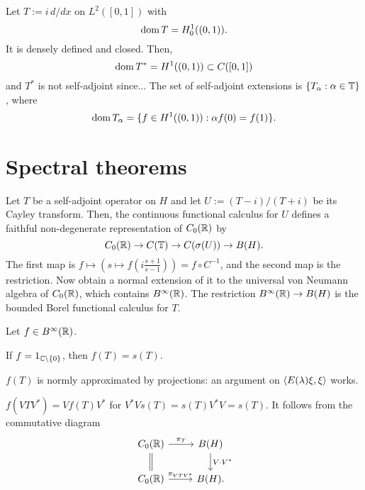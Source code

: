 \documentclass{../../large}
\begin{document}
\begin{ex*}
Let $T:=i\,d/dx$ on $L^2([0,1])$ with
\[\operatorname{dom} T=H_0^1((0,1)).\]
It is densely defined and closed.
Then,
\[\operatorname{dom} T^*=H^1((0,1))\subset C([0,1])\]
and $T^*$ is not self-adjoint since...
The set of self-adjoint extensions is $\{T_\alpha:\alpha\in\mathbb{T}\}$, where
\[\operatorname{dom} T_\alpha=\{f\in H^1((0,1)):\alpha f(0)=f(1)\}.\]
\end{ex*}



\section{Spectral theorems}
\begin{prb}
Let $T$ be a self-adjoint operator on $H$ and let $U:=(T-i)/(T+i)$ be its Cayley transform.
Then, the continuous functional calculus for $U$ defines a faithful non-degenerate representation of $C_0(\mathbb{R})$ by
\[C_0(\mathbb{R})\to C(\mathbb{T})\to C(\sigma(U))\to B(H).\]
The first map is $f\mapsto(s\mapsto f(i\frac{s+1}{s-1}))=f\circ C^{-1}$, and the second map is the restriction.
Now obtain a normal extension of it to the universal von Neumann algebra of $C_0(\mathbb{R})$, which contains $B^\infty(\mathbb{R})$.
The restriction $B^\infty(\mathbb{R})\to B(H)$ is the bounded Borel functional calculus for $T$.
\begin{parts}
\item 
\end{parts}
\end{prb}

\begin{prb}
Let $f\in B^\infty(\mathbb{R})$.
\begin{parts}
\item If $f=1_{\mathbb{C}\setminus\{0\}}$, then $f(T)=s(T)$.
\item $f(T)$ is normly approximated by projections: an argument on $\langle E(\lambda)\xi,\xi\rangle$ works.
\item $f(VTV^*)=Vf(T)V^*$ for $V^*Vs(T)=s(T)V^*V=s(T)$. It follows from the commutative diagram
\[\begin{tikzcd}
C_0(\R)\ar[equals]{d}\ar{r}{\pi_T} & B(H) \ar{d}{V\cdot V^*}\\
C_0(\R)\ar{r}{\pi_{VTV^*}} & B(H).
\end{tikzcd}\]
\end{parts}
\end{prb}
\end{document}
